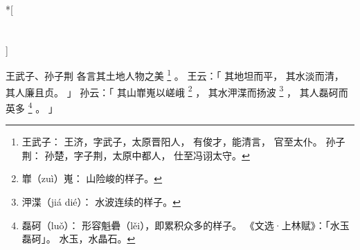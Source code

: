 
\switchcolumn[0]*[\section{}]

王武子、孙子荆
各言其土地人物之美%
\footnote{%
    王武子：
        王济，字武子，太原晋阳人，
        有俊才，能清言，
        官至太仆。
    孙子荆：
        孙楚，字子荆，太原中都人，
        仕至冯诩太守。
}%
。
王云：「
    其地坦而平，
    其水淡而清，
    其人廉且贞。
」
孙云：「
    其山㠑嵬以嵯峨%
    \footnote{%
        㠑（zuì）嵬：
            山险峻的样子。
    }%
    ，
    其水㳌渫而扬波%
    \footnote{%
        㳌渫（jiá dié）：
            水波连续的样子。
    }%
    ，
    其人磊砢而英多%
    \footnote{%
        磊砢（luǒ）：
            形容魁礨（lěi），即累积众多的样子。
            《文选·上林赋》：「水玉磊砢」。
            水玉，水晶石。
    }%
    。
」

\switchcolumn


